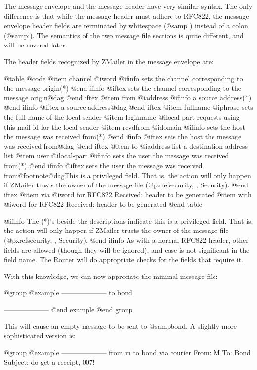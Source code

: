 The message envelope and the message header have very similar syntax.
The only difference is that while the message header must adhere
to RFC822, the message envelope header fields are terminated by
whitespace (@samp{ }) instead of a colon (@samp{:}).
The semantics of the two message file sections is quite different,
and will be covered later.

The header fields recognized by ZMailer in the message envelope are:

@table @code
@item channel @i{word}
@ifinfo
sets the channel corresponding to the message origin(*)
@end ifinfo
@iftex
sets the channel corresponding to the message origin@dag{}
@end iftex
@item from @i{address}
@ifinfo
a source address(*)
@end ifinfo
@iftex
a source address@dag{}
@end iftex
@item fullname @i{phrase}
sets the full name of the local sender
@item loginname @i{local-part}
requests using this mail id for the local sender
@item rcvdfrom @i{domain}
@ifinfo
sets the host the message was received from(*)
@end ifinfo
@iftex
sets the host the message was received from@dag{}
@end iftex
@item to @i{address-list}
a destination address list
@item user @i{local-part}
@ifinfo
sets the user the message was received from(*)
@end ifinfo
@iftex
sets the user the message was received from@footnote{@dag}{This
is a privileged field.
That is, the action will only happen if ZMailer trusts the owner
of the message file (@pxref{security, , Security}).}
@end iftex
@item via @i{word}
for RFC822 Received: header to be generated
@item with @i{word}
for RFC822 Received: header to be generated
@end table

@ifinfo
The (*)'s beside the descriptions indicate this is a privileged field.
That is, the action will only happen if ZMailer trusts the owner of
the message file (@pxref{security, , Security}).
@end ifinfo
As with a normal RFC822 header, other fields are allowed (though they
will be ignored), and case is not significant in the field name.
The Router will do appropriate checks for the fields that require it.

With this knowledge, we can now appreciate the minimal message file:

@group
@example
--------------------
to bond

--------------------
@end example
@end group

This will cause an empty message to be sent to @samp{bond}.
A slightly more sophisticated version is:

@group
@example
--------------------
from m
to bond
via courier
From: M
To: Bond
Subject: do get a receipt, 007!

